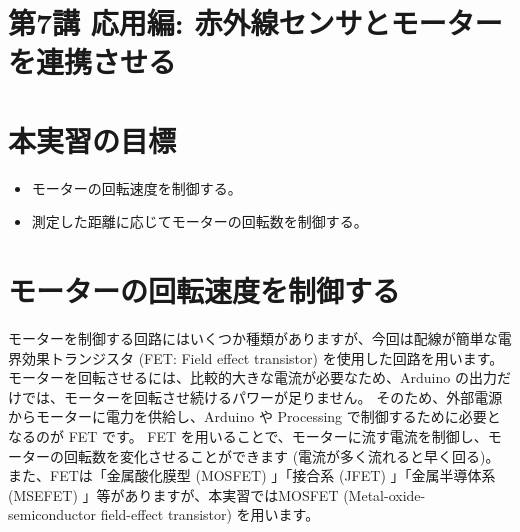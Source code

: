 \documentclass[11pt,a4paper]{jarticle}
\begin{document}
\section*{\LARGE{第7講 応用編: 赤外線センサとモーターを連携させる}}
\section{本実習の目標}
\begin{itemize}
 \item モーターの回転速度を制御する。
 \item 測定した距離に応じてモーターの回転数を制御する。
\end{itemize}


\section{モーターの回転速度を制御する}
モーターを制御する回路にはいくつか種類がありますが、今回は配線が簡単な電界効果トランジスタ (FET: Field effect transistor) を使用した回路を用います。
モーターを回転させるには、比較的大きな電流が必要なため、Arduino の出力だけでは、モーターを回転させ続けるパワーが足りません。
そのため、外部電源からモーターに電力を供給し、Arduino や Processing で制御するために必要となるのが FET です。
FET を用いることで、モーターに流す電流を制御し、モーターの回転数を変化させることができます (電流が多く流れると早く回る)。また、FETは「金属酸化膜型 (MOSFET) 」「接合系 (JFET) 」「金属半導体系 (MSEFET) 」等がありますが、本実習ではMOSFET (Metal-oxide-semiconductor field-effect transistor) を用います。
\end{document}
